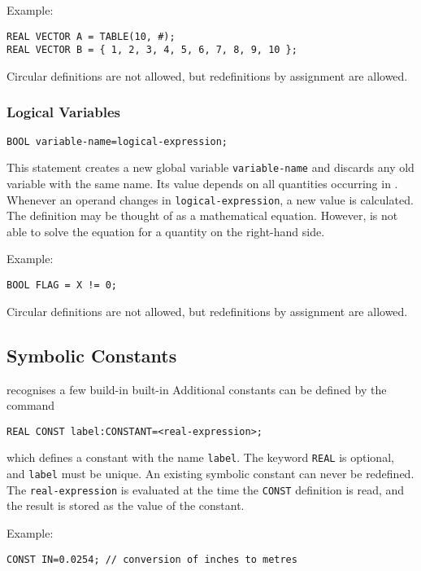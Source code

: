 \noindent Example:
\begin{verbatim}
REAL VECTOR A = TABLE(10, #);
REAL VECTOR B = { 1, 2, 3, 4, 5, 6, 7, 8, 9, 10 };
\end{verbatim}
Circular definitions are not allowed, but redefinitions by assignment 
are allowed.

\subsubsection{Logical Variables}
\begin{verbatim}
BOOL variable-name=logical-expression;
\end{verbatim}
This statement creates a new global variable \texttt{variable-name}
and discards any old variable with the same name.
Its value depends on all quantities occurring
in .
Whenever an operand changes in \texttt{logical-expression},
a new value is calculated.
The definition may be thought of as a mathematical equation.
However, \opal is not able to solve the equation for a quantity on the
right-hand side.

\noindent Example:
\begin{verbatim}
BOOL FLAG = X != 0;
\end{verbatim}
Circular definitions are not allowed, but redefinitions by assignment 
are allowed.

\subsection{Symbolic Constants}
\label{sec:constant}
\opal recognises a few build-in built-in  
Additional constants can be defined by the command
\begin{verbatim}
REAL CONST label:CONSTANT=<real-expression>;
\end{verbatim}
which defines a constant with the name \texttt{label}.
The keyword \texttt{REAL} is optional, and \texttt{label} must be unique.
An existing symbolic constant can never be redefined.
The \texttt{real-expression} is evaluated at the time the
\texttt{CONST} definition is read, and the result is stored as the
value of the constant.

\noindent Example:
\begin{verbatim}
CONST IN=0.0254; // conversion of inches to metres
\end{verbatim}

